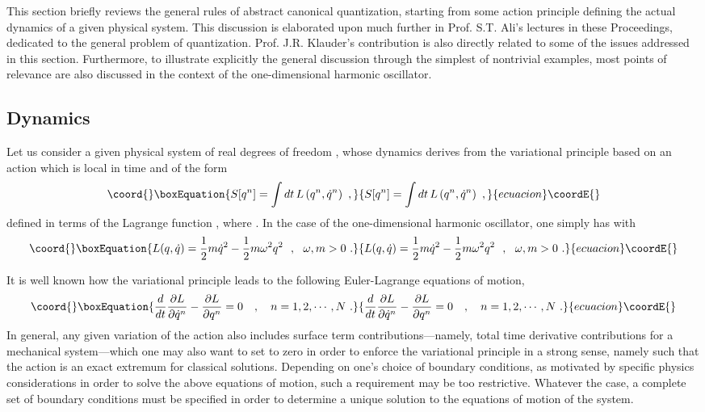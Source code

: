 \documentclass[a4paper,11pt]{article}
\begin{document}
This section briefly reviews\cite{JG1} the general rules of abstract canonical
quantization, starting from some action principle defining the actual
dynamics of a given physical system. This discussion is elaborated upon
much further in Prof. S.T. Ali's lectures in these Proceedings,
dedicated to the general pro\-blem of quantization. Prof. J.R. Klauder's
contribution is also directly related
to some of the issues addressed in this section. Furthermore, to
illustrate ex\-pli\-cit\-ly the general discussion through the simplest of
nontri\-vial examples, most points of relevance are also discussed in the
context of the one-dimensional harmonic oscillator.

\subsection{Dynamics}
\label{Subsect2.1}

Let us consider a given physical system of \coordHE{} real degrees of freedom 
\coordHE{}  \coordHE{}, whose dynamics derives from the variational 
principle based on an action which is local in time and of the form
\begin{equation}\coord{}\boxEquation{
S[q^n]=\int dt\,L\left(q^n,\dot{q}^n\right)\ ,
}{
S[q^n]=\int dt\,L\left(q^n,\dot{q}^n\right)\ ,
}{ecuacion}\coordE{}\end{equation}
defined in terms of the Lagrange function \coordHE{}, where
\coordHE{}. In the case of the one-dimensional harmonic oscillator, 
one simply has \coordHE{} with
\begin{equation}\coord{}\boxEquation{
L(q,\dot{q})=\frac{1}{2}m\dot{q}^2-\frac{1}{2}m\omega^2q^2\ \ ,\ \ 
\omega,m>0\ .
\label{eq:LHO}
}{
L(q,\dot{q})=\frac{1}{2}m\dot{q}^2-\frac{1}{2}m\omega^2q^2\ \ ,\ \ 
\omega,m>0\ .
}{ecuacion}\coordE{}\end{equation}

It is well known how the variational principle leads to the following
Euler-Lagrange equations of motion,
\begin{equation}\coord{}\boxEquation{
\frac{d}{dt}\frac{\partial L}{\partial\dot{q}^n}-
\frac{\partial L}{\partial q^n}=0\ \ \ ,\ \ \ n=1,2,\cdots,N\ .
}{
\frac{d}{dt}\frac{\partial L}{\partial\dot{q}^n}-
\frac{\partial L}{\partial q^n}=0\ \ \ ,\ \ \ n=1,2,\cdots,N\ .
}{ecuacion}\coordE{}\end{equation}
In general, any given variation of the action also includes surface term
contributions---namely, total time derivative contributions for a
mechanical system---which one may also want to set to zero in order to
enforce the variational principle in a strong sense, namely such that the
action is an exact extremum for classical solutions. Depen\-ding on one's 
choice of boundary conditions, as motivated by specific physics 
considerations in order to solve the above equations of motion, such a 
requirement may be too restrictive. Whatever the case, a complete set of 
boundary conditions must be specified in order to determine a unique 
solution to the equations of motion of the system.
\end{document}
